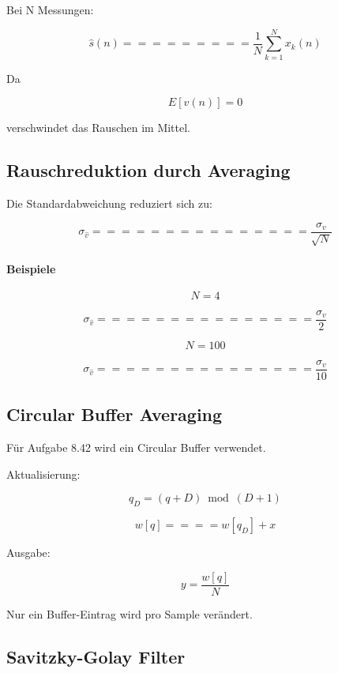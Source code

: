 Bei N Messungen:

\[
\hat s(n)
=========

\frac1N
\sum_{k=1}^{N}
x_k(n)
\]

Da

\[
E[v(n)]=0
\]

verschwindet das Rauschen im Mittel.

\subsection{Rauschreduktion durch Averaging}

Die Standardabweichung reduziert sich zu:

\[
\sigma_{\hat v}
===============

\frac{\sigma_v}
{\sqrt N}
\]

\paragraph{Beispiele}

\[
N=4
\]

\[
\sigma_{\hat v}
===============

\frac{\sigma_v}{2}
\]

\[
N=100
\]

\[
\sigma_{\hat v}
===============

\frac{\sigma_v}{10}
\]

\subsection{Circular Buffer Averaging}

Für Aufgabe 8.42 wird ein Circular Buffer verwendet.

Aktualisierung:

\[
q_D=(q+D)\bmod(D+1)
\]

\[
w[q]
====

w[q_D]
+
x
\]

Ausgabe:

\[
y=
\frac{w[q]}{N}
\]

Nur ein Buffer-Eintrag wird pro Sample verändert.

\subsection{Savitzky-Golay Filter}

